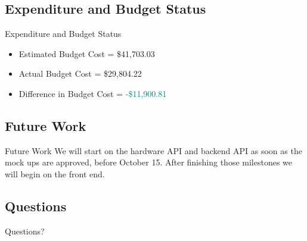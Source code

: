 \documentclass[17pt, aspectratio=169]{beamer}
\begin{document}
\subsection*{Expenditure and Budget Status}
\begin{frame}{Expenditure and Budget Status}
	\begin{itemize}
		\item Estimated Budget Cost = \$41,703.03
		\item Actual Budget Cost = \$29,804.22
		\item Difference in Budget Cost = \textcolor{teal}{-\$11,900.81}
	\end{itemize}
\end{frame}
\subsection{Future Work}
\begin{frame}{Future Work}
	We will start on the hardware API and backend API as soon as the mock ups are approved, before October 15. After finishing those milestones we will begin on the front end.
\end{frame}
\subsection*{Questions}
\begin{frame}
	\begin{huge}
		\begin{center}
			Questions?
		\end{center}
	\end{huge}
\end{frame}
\end{document}
